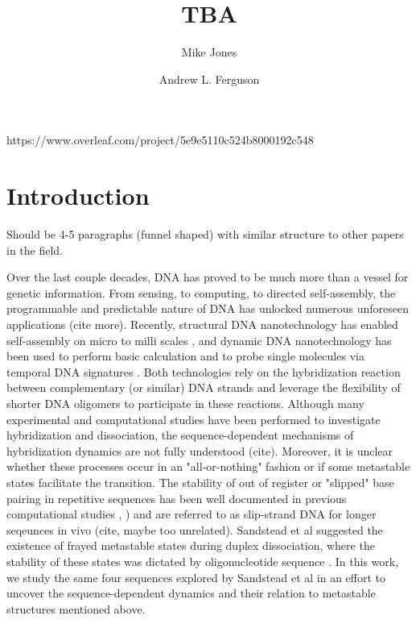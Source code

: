 \documentclass[journal=jpcbfk,manuscript=article]{achemso}
\author{Mike Jones}
\affiliation{%
  Pritzker School of Molecular Engineering, %
  University of Chicago, %
  Chicago, Illinois 60637%
}
\author{Andrew L. Ferguson}
\affiliation{%
  Pritzker School of Molecular Engineering, %
  University of Chicago, %
  Chicago, Illinois 60637%
}
\title[]{TBA}
\begin{document}

\newpage

\begin{abstract}

\noindent 

\end{abstract}
https://www.overleaf.com/project/5e9e5110c524b8000192c548

\newpage

\section{\label{sec:intro}Introduction}
Should be 4-5 paragraphs (funnel shaped) with similar structure to other papers in the field.

Over the last couple decades, DNA has proved to be much more than a vessel for genetic information. From sensing, to computing, to directed self-assembly, the programmable and predictable nature of DNA has unlocked numerous unforeseen applications \citep{Seeman2017DNANanotechnology} (cite more). Recently, structural DNA nanotechnology has enabled self-assembly on micro to milli scales \citep{MhatreV.HoJi-AnnLee2012NIHAccess}, and dynamic DNA nanotechnology has been used to perform basic calculation \citep{Bui2018} and to probe single molecules via temporal DNA signatures \citep{Shah2019}. Both technologies rely on the hybridization reaction between complementary (or similar) DNA strands and leverage the flexibility of shorter DNA oligomers to participate in these reactions. Although many experimental and computational studies have been performed to investigate hybridization and dissociation, the sequence-dependent mechanisms of hybridization dynamics are not fully understood (cite). Moreover, it is unclear whether these processes occur in an "all-or-nothing" fashion or if some metastable states facilitate the transition. The stability of out of register or "slipped" base pairing in repetitive sequences has been well documented in previous computational studies \citep{Phys2014}, \citep{Xiao2019}) and are referred to as slip-strand DNA for longer seqeunces in vivo (cite, maybe too unrelated). Sandstead et al suggested the existence of frayed metastable states during duplex dissociation, where the stability of these states was dictated by oligonucleotide sequence \citep{Sanstead2016}. In this work, we study the same four sequences explored by Sandstead et al in an effort to uncover the sequence-dependent dynamics and their relation to  metastable structures mentioned above.
\end{document}
